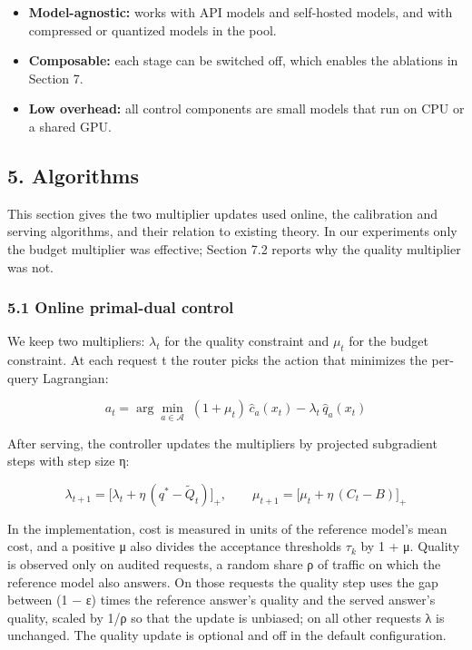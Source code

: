 \documentclass[
  10pt,
]{article}
\providecommand{\tightlist}{%
  \setlength{\itemsep}{0pt}\setlength{\parskip}{0pt}}
\begin{document}
\begin{itemize}
\tightlist
\item
  \textbf{Model-agnostic:} works with API models and self-hosted models,
  and with compressed or quantized models in the pool.
\item
  \textbf{Composable:} each stage can be switched off, which enables the
  ablations in Section 7.
\item
  \textbf{Low overhead:} all control components are small models that
  run on CPU or a shared GPU.
\end{itemize}

\subsection{5. Algorithms}\label{algorithms}

This section gives the two multiplier updates used online, the
calibration and serving algorithms, and their relation to existing
theory. In our experiments only the budget multiplier was effective;
Section 7.2 reports why the quality multiplier was not.

\subsubsection{5.1 Online primal-dual
control}\label{online-primal-dual-control}

We keep two multipliers: \(\lambda_t\) for the quality constraint and
\(\mu_t\) for the budget constraint. At each request t the router picks
the action that minimizes the per-query Lagrangian:

\[
a_t = \arg\min_{a \in \mathcal{A}} \; (1 + \mu_t)\,\hat{c}_a(x_t) - \lambda_t\,\hat{q}_a(x_t)
\]

After serving, the controller updates the multipliers by projected
subgradient steps with step size η:

\[
\lambda_{t+1} = \big[\lambda_t + \eta\,(q^{*} - \tilde{Q}_t)\big]_{+},
\qquad
\mu_{t+1} = \big[\mu_t + \eta\,(C_t - B)\big]_{+}
\]

In the implementation, cost is measured in units of the reference
model's mean cost, and a positive μ also divides the acceptance
thresholds \(\tau_k\) by 1 + μ. Quality is observed only on audited
requests, a random share ρ of traffic on which the reference model also
answers. On those requests the quality step uses the gap between (1 − ε)
times the reference answer's quality and the served answer's quality,
scaled by 1/ρ so that the update is unbiased; on all other requests λ is
unchanged. The quality update is optional and off in the default
configuration.
\end{document}
